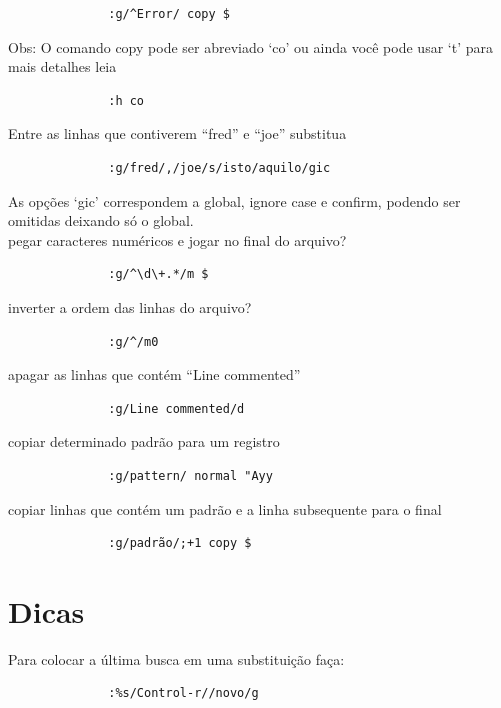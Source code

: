 \documentclass[10pt,a4paper,openany]{book}
\begin{document}
\begin{verbatim}
			  :g/^Error/ copy $
\end{verbatim}

Obs: O comando copy pode ser abreviado `co' ou ainda você pode usar `t'
para mais detalhes leia

\begin{verbatim}
			  :h co
\end{verbatim}

Entre as linhas que contiverem ``fred'' e ``joe'' substitua

\begin{verbatim}
			  :g/fred/,/joe/s/isto/aquilo/gic
\end{verbatim}

As opções `gic' correspondem a global, ignore case e confirm, podendo ser
omitidas deixando só o global. \\


pegar caracteres numéricos e jogar no final do arquivo?

\begin{verbatim}
			  :g/^\d\+.*/m $
\end{verbatim}

inverter a ordem das linhas do arquivo?

\begin{verbatim}
			  :g/^/m0
\end{verbatim}

apagar as linhas que contém ``Line commented''

\begin{verbatim}
			  :g/Line commented/d
\end{verbatim}

copiar determinado padrão para um registro

\begin{verbatim}
			  :g/pattern/ normal "Ayy
\end{verbatim}

copiar linhas que contém um padrão e a linha subsequente para o final

\begin{verbatim}
			  :g/padrão/;+1 copy $
\end{verbatim}

\section{Dicas }
Para colocar a última busca em uma substituição faça:

\begin{verbatim}
			  :%s/Control-r//novo/g
\end{verbatim}
\end{document}
